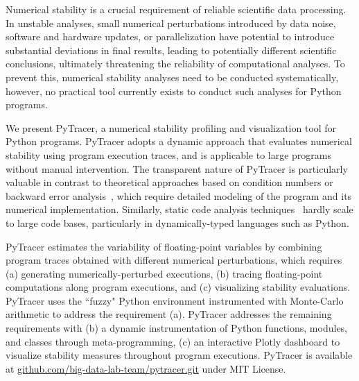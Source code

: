 \documentclass[10pt,journal,compsoc]{IEEEtran}
\newcommand{\pytracer}[0]{PyTracer\xspace}
\DeclareRobustCommand{\add}[1]{#1}
\DeclareRobustCommand{\remove}[1]{}
\begin{document}
Numerical stability is a crucial requirement of reliable scientific data
processing. In unstable analyses, small numerical perturbations introduced by
data noise, software and hardware updates, or parallelization have potential to
introduce substantial deviations in final results, leading to potentially
different scientific conclusions, ultimately threatening the reliability of
computational analyses. To prevent this, numerical stability analyses need to be
conducted systematically, however, no practical tool currently exists to conduct
such analyses for Python programs.

We present PyTracer, a numerical stability profiling and visualization tool for
Python programs. \pytracer adopts a dynamic approach that evaluates numerical
stability using program execution traces, and is applicable to large programs
without manual intervention. The transparent nature of \pytracer is particularly
valuable in contrast to theoretical approaches based on condition numbers or
backward error analysis~\cite{higham2002accuracy}, which require
detailed modeling of the program and its numerical implementation. Similarly,
static code analysis techniques~\cite{goubault2006static} hardly scale
to large code bases, particularly in dynamically-typed languages such as Python.

\pytracer estimates the variability of floating-point variables by combining
program traces obtained with different numerical perturbations, which requires
(\add{a}\remove{1}) generating numerically-perturbed executions,
(\add{b}\remove{2}) tracing floating-point computations along program
executions, and (\add{c}\remove{3}) visualizing stability evaluations.
\add{PyTracer uses the ``fuzzy" Python environment instrumented with Monte-Carlo
    arithmetic to address the requirement (a). \mbox{\pytracer} addresses the
    remaining requirements with (b) a dynamic instrumentation of Python functions,
    modules, and classes through meta-programming, (c) an interactive Plotly
    dashboard to visualize stability measures throughout program executions.
    \mbox{\pytracer} is available at
    \mbox{\href{https://github.com/big-data-lab-team/pytracer.git}{github.com/big-data-lab-team/pytracer.git}}
    under MIT License.} \remove{\mbox{\pytracer} addresses these requirements with
    (1) a ``fuzzy" Python interpreter instrumented with Monte-Carlo arithmetic, (2)
    a dynamic instrumentation of Python functions, modules, and classes through
    meta-programming, (3) an interactive Plotly dashboard to visualize stability
    measures throughout program executions. }
\end{document}
